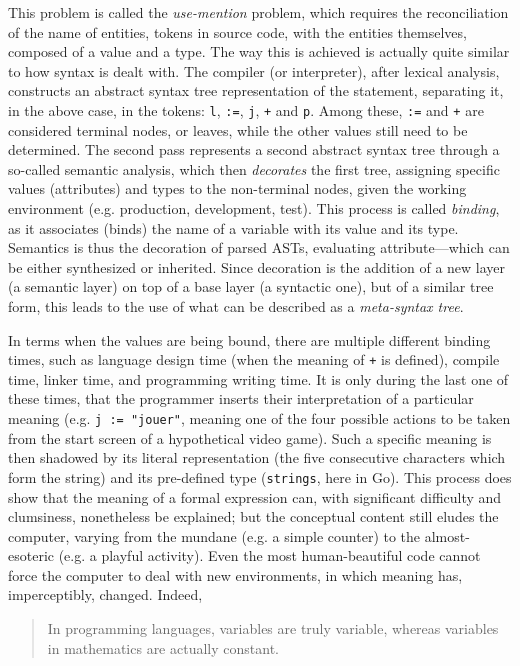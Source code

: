 This problem is called the \emph{use-mention} problem, which requires the reconciliation of the name of entities, tokens in source code, with the entities themselves, composed of a value and a type. The way this is achieved is actually quite similar to how syntax is dealt with. The compiler (or interpreter), after lexical analysis, constructs an abstract syntax tree representation of the statement, separating it, in the above case, in the tokens: \lstinline{l}, \lstinline{:=}, \lstinline{j}, \lstinline{+} and \lstinline{p}. Among these, \lstinline{:=} and \lstinline{+} are considered terminal nodes, or leaves, while the other values still need to be determined. The second pass represents a second abstract syntax tree through a so-called semantic analysis, which then \emph{decorates} the first tree, assigning specific values (attributes) and types to the non-terminal nodes, given the working environment (e.g. production, development, test). This process is called \emph{binding}, as it associates (binds) the name of a variable with its value and its type. Semantics is thus the decoration of parsed ASTs, evaluating attribute—which can be either synthesized or inherited. Since decoration is the addition of a new layer (a semantic layer) on top of a base layer (a syntactic one), but of a similar tree form, this leads to the use of what can be described as a \emph{meta-syntax tree}.

In terms when the values are being bound, there are multiple different binding times, such as language design time (when the meaning of \lstinline{+} is defined), compile time, linker time, and programming writing time. It is only during the last one of these times, that the programmer inserts their interpretation of a particular meaning (e.g. \lstinline{j := "jouer"}, meaning one of the four possible actions to be taken from the start screen of a hypothetical video game). Such a specific meaning is then shadowed by its literal representation (the five consecutive characters which form the string) and its pre-defined type (\lstinline{strings}, here in Go). This process does show that the meaning of a formal expression can, with significant difficulty and clumsiness, nonetheless be explained; but the conceptual content still eludes the computer, varying from the mundane (e.g. a simple counter) to the almost-esoteric (e.g. a playful activity). Even the most human-beautiful code cannot force the computer to deal with new environments, in which meaning has, imperceptibly, changed. Indeed,

\begin{quote}
  In programming languages, variables are truly variable, whereas variables in mathematics are actually constant\citep{wirth_essence_2003}.
\end{quote}

